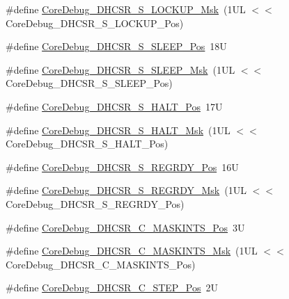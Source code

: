 \begin{DoxyCompactItemize}
\item 
\#define \mbox{\hyperlink{group___c_m_s_i_s___core_debug_ga7b67e4506d7f464ef5dafd6219739756}{Core\+Debug\+\_\+\+D\+H\+C\+S\+R\+\_\+\+S\+\_\+\+L\+O\+C\+K\+U\+P\+\_\+\+Msk}}~(1\+U\+L $<$$<$ Core\+Debug\+\_\+\+D\+H\+C\+S\+R\+\_\+\+S\+\_\+\+L\+O\+C\+K\+U\+P\+\_\+\+Pos)
\item 
\#define \mbox{\hyperlink{group___c_m_s_i_s___core_debug_ga349ccea33accc705595624c2d334fbcb}{Core\+Debug\+\_\+\+D\+H\+C\+S\+R\+\_\+\+S\+\_\+\+S\+L\+E\+E\+P\+\_\+\+Pos}}~18U
\item 
\#define \mbox{\hyperlink{group___c_m_s_i_s___core_debug_ga98d51538e645c2c1a422279cd85a0a25}{Core\+Debug\+\_\+\+D\+H\+C\+S\+R\+\_\+\+S\+\_\+\+S\+L\+E\+E\+P\+\_\+\+Msk}}~(1\+U\+L $<$$<$ Core\+Debug\+\_\+\+D\+H\+C\+S\+R\+\_\+\+S\+\_\+\+S\+L\+E\+E\+P\+\_\+\+Pos)
\item 
\#define \mbox{\hyperlink{group___c_m_s_i_s___core_debug_ga760a9a0d7f39951dc3f07d01f1f64772}{Core\+Debug\+\_\+\+D\+H\+C\+S\+R\+\_\+\+S\+\_\+\+H\+A\+L\+T\+\_\+\+Pos}}~17U
\item 
\#define \mbox{\hyperlink{group___c_m_s_i_s___core_debug_ga9f881ade3151a73bc5b02b73fe6473ca}{Core\+Debug\+\_\+\+D\+H\+C\+S\+R\+\_\+\+S\+\_\+\+H\+A\+L\+T\+\_\+\+Msk}}~(1\+U\+L $<$$<$ Core\+Debug\+\_\+\+D\+H\+C\+S\+R\+\_\+\+S\+\_\+\+H\+A\+L\+T\+\_\+\+Pos)
\item 
\#define \mbox{\hyperlink{group___c_m_s_i_s___core_debug_ga20a71871ca8768019c51168c70c3f41d}{Core\+Debug\+\_\+\+D\+H\+C\+S\+R\+\_\+\+S\+\_\+\+R\+E\+G\+R\+D\+Y\+\_\+\+Pos}}~16U
\item 
\#define \mbox{\hyperlink{group___c_m_s_i_s___core_debug_gac4cd6f3178de48f473d8903e8c847c07}{Core\+Debug\+\_\+\+D\+H\+C\+S\+R\+\_\+\+S\+\_\+\+R\+E\+G\+R\+D\+Y\+\_\+\+Msk}}~(1\+U\+L $<$$<$ Core\+Debug\+\_\+\+D\+H\+C\+S\+R\+\_\+\+S\+\_\+\+R\+E\+G\+R\+D\+Y\+\_\+\+Pos)
\item 
\#define \mbox{\hyperlink{group___c_m_s_i_s___core_debug_ga0d2907400eb948a4ea3886ca083ec8e3}{Core\+Debug\+\_\+\+D\+H\+C\+S\+R\+\_\+\+C\+\_\+\+M\+A\+S\+K\+I\+N\+T\+S\+\_\+\+Pos}}~3U
\item 
\#define \mbox{\hyperlink{group___c_m_s_i_s___core_debug_ga77fe1ef3c4a729c1c82fb62a94a51c31}{Core\+Debug\+\_\+\+D\+H\+C\+S\+R\+\_\+\+C\+\_\+\+M\+A\+S\+K\+I\+N\+T\+S\+\_\+\+Msk}}~(1\+U\+L $<$$<$ Core\+Debug\+\_\+\+D\+H\+C\+S\+R\+\_\+\+C\+\_\+\+M\+A\+S\+K\+I\+N\+T\+S\+\_\+\+Pos)
\item 
\#define \mbox{\hyperlink{group___c_m_s_i_s___core_debug_gae1fc39e80de54c0339cbb1b298a9f0f9}{Core\+Debug\+\_\+\+D\+H\+C\+S\+R\+\_\+\+C\+\_\+\+S\+T\+E\+P\+\_\+\+Pos}}~2U
$$
\end{DoxyCompactItemize}
